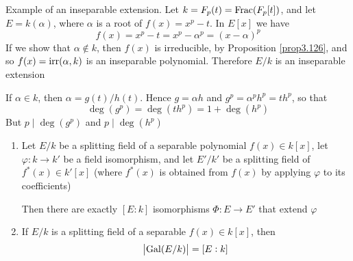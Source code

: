 \documentclass[11pt]{article}
\DeclareMathOperator{\Frac}{Frac}
\begin{document}
\begin{examplle}[]
Example of an inseparable extension. Let \(k=\F_p(t)=\Frac(\F_p[t])\), and
let \(E=k(\alpha)\), where \(\alpha\) is a root of \(f(x)=x^p-t\). In \(E[x]\) we have
\begin{equation*}
f(x)=x^p-t=x^p-\alpha^p=(x-\alpha)^p
\end{equation*}
If we show that \(\alpha\not\in k\), then \(f(x)\) is irreducible, by
Proposition \ref{prop3.126}, and so \(f(x)=\operatorname{irr}(\alpha,k)\) is an inseparable
polynomial. Therefore \(E/k\) is an inseparable extension

If \(\alpha\in k\), then \(\alpha=g(t)/h(t)\). Hence \(g=\alpha h\) and 
\(g^p=\alpha^p h^p=th^p\), so that
\begin{equation*}
\deg(g^p)=\deg(th^p)=1+\deg(h^p)
\end{equation*}
But \(p\mid\deg(g^p)\) and \(p\mid\deg(h^p)\)
\end{examplle}

\begin{theorem}[]
\label{nthm3.7}
\begin{enumerate}
\item Let \(E/k\) be a splitting field of a separable polynomial
\(f(x)\in k[x]\), let \(\varphi:k\to k'\) be a field isomorphism, and let 
\(E'/k'\) be a splitting field of \(f^*(x)\in k'[x]\) (where \(f^*(x)\) is
obtained from \(f(x)\) by applying \(\varphi\) to its coefficients)
\begin{center}
\end{center}
Then there are exactly \([E:k]\) isomorphisms \(\Phi:E\to E'\) that extend \(\varphi\)
\item If \(E/k\) is a splitting field of a separable \(f(x)\in k[x]\), then
\begin{equation*}
\abs{\operatorname{Gal}(E/k)}=[E:k]
\end{equation*}
\end{enumerate}
\end{theorem}
\end{document}
